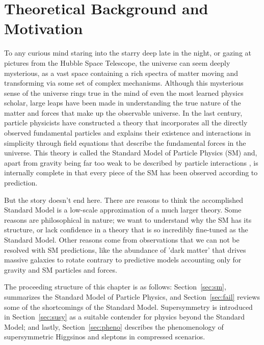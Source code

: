 \chapter{Theoretical Background and Motivation}
\label{ch:thy}
To any curious mind staring into the starry deep late in the night, or gazing at pictures from the Hubble Space Telescope, the universe can seem deeply mysterious, as a vast space containing a rich spectra of matter moving and transforming via some set of complex mechanisms.  Although this mysterious sense of the universe rings true in the mind of even the most learned physics scholar, large leaps have been made in understanding the true nature of the matter and forces that make up the observable universe.   In the last century, particle physicists have constructed a theory that incorporates all the directly observed fundamental particles and explains their existence and interactions in simplicity through field equations that describe the fundamental forces in the universe.  This theory is called the Standard Model of Particle Physics (SM) and, apart from gravity being far too weak to be described by particle interactions \cite{Chalmers:2002wu}, is internally complete in that every piece of the SM has been observed according to prediction.

But the story doesn't end here.  There are reasons to think the accomplished Standard Model is a low-scale approximation of a much larger theory.  Some reasons are philosophical in nature; we want to understand why the SM has its structure, or lack confidence in a theory that is so incredibly fine-tuned as the Standard Model.  Other reasons come from observations that we can not be resolved with SM predictions, like the  abundance of 'dark matter' that drives massive galaxies to rotate contrary to predictive models accounting only for gravity and SM particles and forces.

The proceeding structure of this chapter is as follows: Section~\ref{sec:sm}, summarizes the Standard Model of Particle Physics, and Section~\ref{sec:fail} reviews some of the shortcomings of the Standard Model.  Supersymmetry is introduced in Section~\ref{sec:susy} as a suitable contender for physics beyond the Standard Model; and lastly, Section~\ref{sec:pheno} describes the phenomenology of supersymmetric Higgsinos and sleptons in compressed scenarios.

